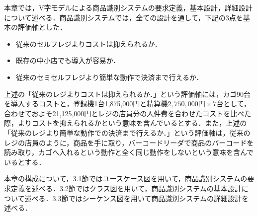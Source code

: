 

本章では，V字モデルによる商品識別システムの要求定義，基本設計，詳細設計について述べる．商品識別システムでは，全ての設計を通して，下記の3点を基本の評価軸とした．

\begin{itemize}
\item 従来のセルフレジよりコストは抑えられるか．
\item 既存の中小店でも導入が容易か．
\item 従来のセミセルフレジより簡単な動作で決済まで行えるか．
\end{itemize}


上述の「従来のレジよりコストは抑えられるか．」という評価軸には，カゴ90台を導入するコストと，登録機1台1,875,000円と精算機$2,750,000円\times7台$として，合わせておよそ21,125,000円\cite{super}とレジの店員分の人件費を合わせたコストを比べた際，よりコストを抑えられるかという意味を含んでいるとする．また，上述の「従来のレジより簡単な動作での決済まで行えるか．」という評価軸は，従来のレジの店員のように，商品を手に取り，バーコードリーダで商品のバーコードを読み取り，カゴへ入れるという動作と全く同じ動作をしないという意味を含んでいるとする．


本章の構成について，3.1節ではユースケース図を用いて，商品識別システムの要求定義を述べる．3.2節ではクラス図を用いて，商品識別システムの基本設計について述べる．3.3節ではシーケンス図を用いて商品識別システムの詳細設計を述べる．